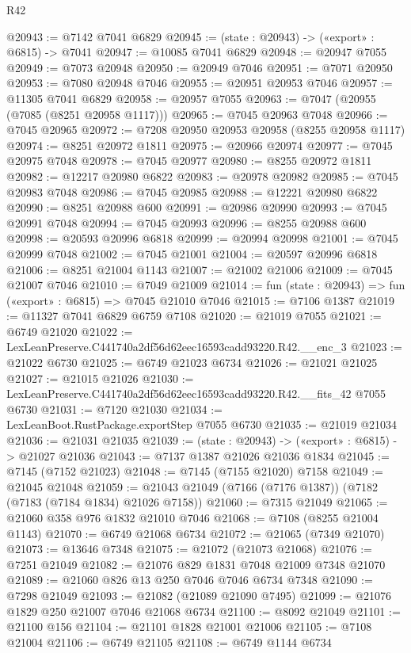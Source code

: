 \begin{lexlean}{R42}
\begin{coremodule}
{@20943 := @7142 @7041 @6829
@20945 := (state : @20943) -> («export» : @6815) -> @7041
@20947 := @10085 @7041 @6829
@20948 := @20947 @7055
@20949 := @7073 @20948
@20950 := @20949 @7046
@20951 := @7071 @20950
@20953 := @7080 @20948 @7046
@20955 := @20951 @20953 @7046
@20957 := @11305 @7041 @6829
@20958 := @20957 @7055
@20963 := @7047 (@20955 (@7085 (@8251 @20958 @1117)))
@20965 := @7045 @20963 @7048
@20966 := @7045 @20965
@20972 := @7208 @20950 @20953 @20958 (@8255 @20958 @1117)
@20974 := @8251 @20972 @1811
@20975 := @20966 @20974
@20977 := @7045 @20975 @7048
@20978 := @7045 @20977
@20980 := @8255 @20972 @1811
@20982 := @12217 @20980 @6822
@20983 := @20978 @20982
@20985 := @7045 @20983 @7048
@20986 := @7045 @20985
@20988 := @12221 @20980 @6822
@20990 := @8251 @20988 @600
@20991 := @20986 @20990
@20993 := @7045 @20991 @7048
@20994 := @7045 @20993
@20996 := @8255 @20988 @600
@20998 := @20593 @20996 @6818
@20999 := @20994 @20998
@21001 := @7045 @20999 @7048
@21002 := @7045 @21001
@21004 := @20597 @20996 @6818
@21006 := @8251 @21004 @1143
@21007 := @21002 @21006
@21009 := @7045 @21007 @7046
@21010 := @7049 @21009
@21014 := fun (state : @20943) => fun («export» : @6815) => @7045 @21010 @7046
@21015 := @7106 @1387
@21019 := @11327 @7041 @6829 @6759 @7108
@21020 := @21019 @7055
@21021 := @6749 @21020
@21022 := LexLeanPreserve.C441740a2df56d62eec16593cadd93220.R42.__enc_3
@21023 := @21022 @6730
@21025 := @6749 @21023 @6734
@21026 := @21021 @21025
@21027 := @21015 @21026
@21030 := LexLeanPreserve.C441740a2df56d62eec16593cadd93220.R42.__fits_42 @7055 @6730
@21031 := @7120 @21030
@21034 := LexLeanBoot.RustPackage.exportStep @7055 @6730
@21035 := @21019 @21034
@21036 := @21031 @21035
@21039 := (state : @20943) -> («export» : @6815) -> @21027 @21036
@21043 := @7137 @1387 @21026 @21036 @1834
@21045 := @7145 (@7152 @21023)
@21048 := @7145 (@7155 @21020) @7158
@21049 := @21045 @21048
@21059 := @21043 @21049 (@7166 (@7176 @1387)) (@7182 (@7183 (@7184 @1834) @21026 @7158))
@21060 := @7315 @21049
@21065 := @21060 @358 @976 @1832 @21010 @7046
@21068 := @7108 (@8255 @21004 @1143)
@21070 := @6749 @21068 @6734
@21072 := @21065 (@7349 @21070)
@21073 := @13646 @7348
@21075 := @21072 (@21073 @21068)
@21076 := @7251 @21049
@21082 := @21076 @829 @1831 @7048 @21009 @7348 @21070
@21089 := @21060 @826 @13 @250 @7046 @7046 @6734 @7348
@21090 := @7298 @21049
@21093 := @21082 (@21089 @21090 @7495)
@21099 := @21076 @1829 @250 @21007 @7046 @21068 @6734
@21100 := @8092 @21049
@21101 := @21100 @156
@21104 := @21101 @1828 @21001 @21006
@21105 := @7108 @21004
@21106 := @6749 @21105
@21108 := @6749 @1144 @6734
}
\end{coremodule}
\end{lexlean}
